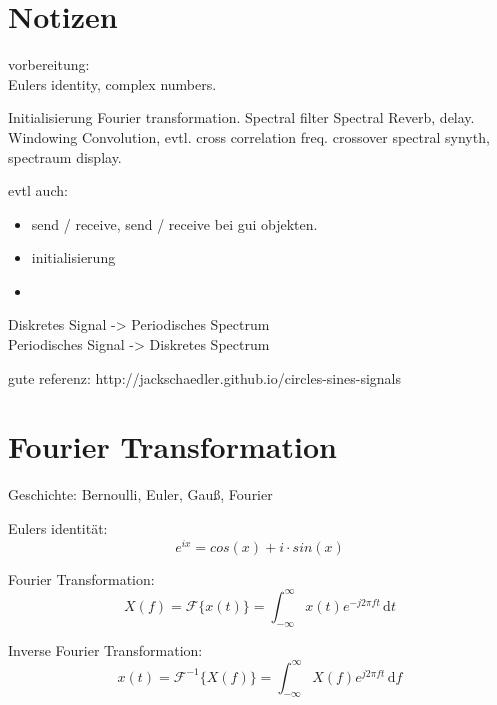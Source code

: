 \section{Notizen}

vorbereitung:\\
Eulers identity, complex numbers.



Initialisierung
Fourier transformation.
Spectral filter
Spectral Reverb, delay.
Windowing
Convolution,
evtl. cross correlation
freq. crossover
spectral synyth,
spectraum display.


evtl auch:
\begin{itemize}
	\item send / receive, send / receive bei gui objekten.
	\item initialisierung
	\item 
\end{itemize}


Diskretes Signal -> Periodisches Spectrum \\
Periodisches Signal -> Diskretes Spectrum

gute referenz:
http://jackschaedler.github.io/circles-sines-signals




\section{Fourier Transformation}

Geschichte:
Bernoulli, Euler, Gauß, Fourier

Eulers identität:
\begin{equation}
	e ^{ix} = cos(x)+i \cdot sin(x)
\end{equation}

Fourier Transformation:\\
\begin{equation}
	X(f)= \mathcal{F} \{x(t)\} = \int_{-\infty}^\infty \! x(t) e^{-j2\pi ft} \, \mathrm{d}t
\end{equation}

Inverse Fourier Transformation:\\
\begin{equation}
	x(t)= \mathcal{F}^{-1} \{X(f)\} = \int_{-\infty}^\infty \! X(f) e^{j2\pi ft} \, \mathrm{d}f
\end{equation}

